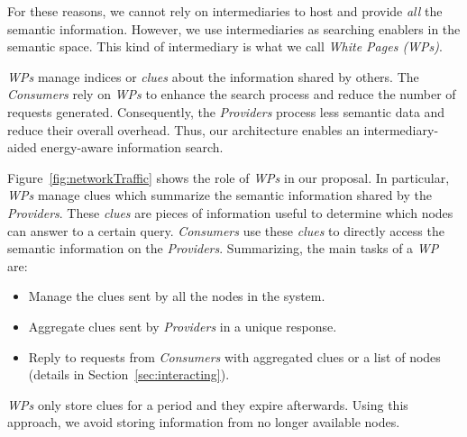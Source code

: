 For these reasons, we cannot rely on intermediaries to host and provide \emph{all} the semantic information.
However, we use intermediaries as searching enablers in the semantic space.
This kind of intermediary is what we call \emph{White Pages (WPs)}.

\emph{WPs} manage indices or \emph{clues} about the information shared by others.
The \emph{Consumers} rely on \emph{WPs} to enhance the search process and reduce the number of requests generated.
Consequently, the \emph{Providers} process less semantic data and reduce their overall overhead.
Thus, our architecture enables an intermediary-aided energy-aware information search.




Figure~\ref{fig:networkTraffic} shows the role of \emph{WPs} in our proposal.
In particular, \emph{WPs} manage clues which summarize the semantic information shared by the \emph{Providers}.
These \emph{clues} are pieces of information useful to determine which nodes can answer to a certain query.
\emph{Consumers} use these \emph{clues} to directly access the semantic information on the \emph{Providers}.
Summarizing, the main tasks of a \emph{WP} are:
\begin{itemize}
 \item Manage the clues sent by all the nodes in the system.
 \item Aggregate clues sent by \emph{Providers} in a unique response.
 \item Reply to requests from \emph{Consumers} with aggregated clues or a list of nodes (details in Section~\ref{sec:interacting}).
\end{itemize}

\emph{WPs} only store clues for a period and they expire afterwards.
Using this approach, we avoid storing information from no longer available nodes.



